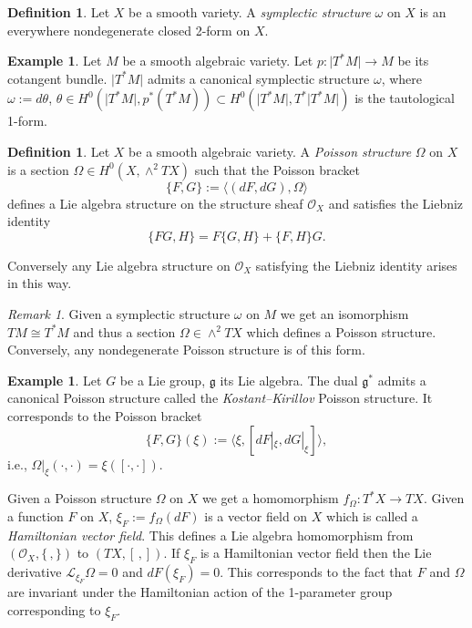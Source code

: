 \documentclass[12pt,a4paper,oneside,english]{smfart}
\theoremstyle{definition}
\newtheorem{defn}[thm]{Definition}
\newtheorem{exmp}[thm]{Example}
\theoremstyle{remark}
\newtheorem{rem}[thm]{Remark}
\newcommand{\cO}{\mathcal{O}}
\newcommand{\tot}[1]{\lvert #1 \rvert}
\begin{document}
\begin{defn}\label{t5.1}
Let $X$ be a smooth variety. A \emph{symplectic structure} $\omega$ on $X$ is an everywhere nondegenerate closed 2-form on $X$.
\end{defn}

\begin{exmp}\label{t5.2}
Let $M$ be a smooth algebraic variety. Let $p \colon \tot{T^*M} \to M$ be its cotangent bundle. $\tot{T^*M}$ admits a canonical symplectic structure $\omega$, where $\omega := d\theta$, $\theta \in H^0(\tot{T^*M}, p^*(T^*M)) \subset H^0(\tot{T^*M}, T^*\tot{T^*M})$ is the tautological 1-form.
\end{exmp}

\begin{defn}\label{t5.3}
Let $X$ be a smooth algebraic variety. A \emph{Poisson structure} $\Omega$ on $X$ is a section $\Omega \in H^0(X, \wedge^2 TX)$ such that the Poisson bracket
\[
\{F, G\} := \langle (dF, dG), \Omega \rangle
\]
defines a Lie algebra structure on the structure sheaf $\cO_X$ and satisfies the Liebniz identity
\[
\{FG, H\} = F\{G, H\} + \{F, H\}G.
\]
\end{defn}

Conversely any Lie algebra structure on $\cO_X$ satisfying the Liebniz identity arises in this way.

\begin{rem}\label{t5.4}
Given a symplectic structure $\omega$ on $M$ we get an isomorphism $TM \cong T^*M$ and thus a section $\Omega \in \wedge^2 TX$ which defines a Poisson structure. Conversely, any nondegenerate Poisson structure is of this form.
\end{rem}

\begin{exmp}\label{t5.5}
Let $G$ be a Lie group, $\mathfrak{g}$ its Lie algebra. The dual $\mathfrak{g}^*$ admits a canonical Poisson structure called the \emph{Kostant--Kirillov} Poisson structure. It corresponds to the Poisson bracket
\[
\{F, G\}(\xi) := \langle \xi, [dF|_{\xi}, dG|_{\xi}] \rangle,
\]
i.e., $\Omega|_{\xi}(\cdot, \cdot) = \xi([\cdot, \cdot])$.
\end{exmp}

Given a Poisson structure $\Omega$ on $X$ we get a homomorphism $f_\Omega \colon T^*X \to TX$. Given a function $F$ on $X$, $\xi_F := f_\Omega(dF)$ is a vector field on $X$ which is called a \emph{Hamiltonian vector field}. This defines a Lie algebra homomorphism from $(\cO_X, \{\,,\})$ to $(TX, [\,,])$. If $\xi_F$ is a Hamiltonian vector field then the Lie derivative $\mathcal{L}_{\xi_F} \Omega = 0$ and $dF(\xi_F) = 0$. This corresponds to the fact that $F$ and $\Omega$ are invariant under the Hamiltonian action of the 1-parameter group corresponding to $\xi_F$.
\end{document}
